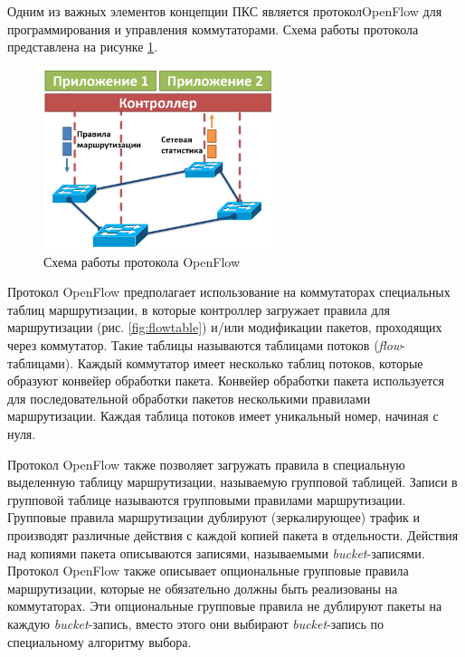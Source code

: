 \documentclass[../thesis.tex]{subfiles}
\begin{document}
Одним из важных элементов концепции ПКС является протокол\linebreak OpenFlow \cite{mckeown2008openflow, openflow15} для программирования и управления коммутаторами.
Схема работы протокола представлена на рисунке \ref{fig:openflow}.

\begin{figure}
\centering
\includegraphics[width=0.6\textwidth]{figures/openflow.jpg}
\caption{Схема работы протокола OpenFlow} \label{fig:openflow}
\end{figure}

Протокол OpenFlow предполагает использование на коммутаторах специальных таблиц маршрутизации, в которые контроллер загружает правила для маршрутизации (рис. \ref{fig:flowtable}) и/или модификации пакетов, проходящих через коммутатор.
Такие таблицы называются таблицами потоков (\textit{flow}-таблицами).
Каждый коммутатор имеет несколько таблиц потоков, которые образуют конвейер обработки пакета.
Конвейер обработки пакета используется для последовательной обработки пакетов несколькими правилами маршрутизации.
Каждая таблица потоков имеет уникальный номер, начиная с нуля.

Протокол OpenFlow также позволяет загружать правила в специальную выделенную таблицу маршрутизации, называемую групповой таблицей.
Записи в групповой таблице называются групповыми правилами маршрутизации.
Групповые правила маршрутизации дублируют (зеркалирующее) трафик и производят различные действия с каждой копией пакета в отдельности.
Действия над копиями пакета описываются записями, называемыми \textit{bucket}-записями.
Протокол OpenFlow также описывает опциональные групповые правила маршрутизации, которые не обязательно должны быть реализованы на коммутаторах.
Эти опциональные групповые правила не дублируют пакеты на каждую \textit{bucket}-запись, вместо этого они выбирают \textit{bucket}-запись по специальному алгоритму выбора.
\end{document}
